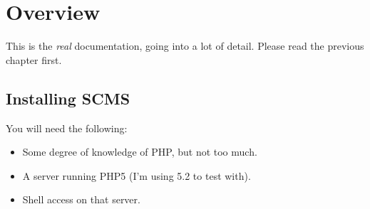 %
%
%
%
%
%
% 
%
% 
% 
%

\chapter{Overview}
This is the \emph{real} documentation, going into a lot of detail.
Please read the previous chapter first.
\section{Installing SCMS}
\label{installation}
You will need the following:
\begin{itemize}
\item Some degree of knowledge of PHP, but not too much.
 \item A server running PHP5 (I'm using 5.2 to test with).
\item Shell access on that server.
\end{itemize}

